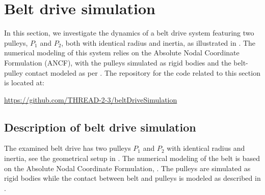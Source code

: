 \section{Belt drive simulation}\label{sec:beltdrive}
In this section, we investigate the dynamics of a belt drive system featuring two pulleys, $P_1$ and $P_2$, both with identical radius and inertia, as illustrated in . The numerical modeling of this system relies on the Absolute Nodal Coordinate Formulation (ANCF), with the pulleys simulated as rigid bodies and the belt-pulley contact modeled as per \cite{Ntarladima2023}.
The repository for the code related to this section is located at:
\bi
  \item[] \url{https://github.com/THREAD-2-3/beltDriveSimulation}
\ei

\subsection{Description of belt drive simulation}
The examined belt drive has two pulleys $P_1$ and $P_2$ with identical radius and inertia, see the geometrical setup in .
%
The numerical modeling of the belt is based on the Absolute Nodal Coordinate Formulation, \cite{Gerstmayr2008}. The pulleys are simulated as rigid bodies while the contact between belt and pulleys is modeled as described in \cite{Ntarladima2023}.



